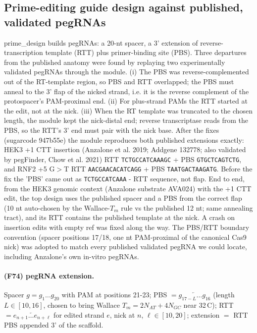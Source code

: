 \subsection{Prime-editing guide design against published, validated pegRNAs}
prime\_design builds pegRNAs: a 20-nt spacer, a 3' extension of reverse-transcription template (RTT) plus primer-binding site (PBS). Three departures from the published anatomy were found by replaying two experimentally validated pegRNAs through the module. (i) The PBS was reverse-complemented out of the RT-template region, so PBS and RTT overlapped; the PBS must anneal to the 3' flap of the nicked strand, i.e. it is the reverse complement of the protospacer's PAM-proximal end. (ii) For plus-strand PAMs the RTT started at the edit, not at the nick. (iii) When the RT template was truncated to the chosen length, the module kept the nick-distal end; reverse transcriptase reads from the PBS, so the RTT's 3' end must pair with the nick base. After the fixes (sugarcode 947b55e) the module reproduces both published extensions exactly: HEK3 +1 CTT insertion (Anzalone et al. 2019; Addgene 132778; also validated by pegFinder, Chow et al. 2021) RTT \texttt{TCTGCCATCAAAGC} + PBS \texttt{GTGCTCAGTCTG}, and RNF2 +5 G$>$T RTT \texttt{AACGAACACATCAGG} + PBS \texttt{TAATGACTAAGATG}. Before the fix the 'PBS' came out as \texttt{TCTGCCATCAAA} - RTT sequence, not flap. End to end, from the HEK3 genomic context (Anzalone substrate AVA024) with the +1 CTT edit, the top design uses the published spacer and a PBS from the correct flap (10 nt auto-chosen by the Wallace-$T_m$ rule vs the published 12 nt; same annealing tract), and its RTT contains the published template at the nick. A crash on insertion edits with empty ref was fixed along the way. The PBS/RTT boundary convention (spacer positions 17/18, one nt PAM-proximal of the canonical Cas9 nick) was adopted to match every published validated pegRNA we could locate, including Anzalone's own in-vitro pegRNAs.
\paragraph{(F74) pegRNA extension.} Spacer $g=g_1\dots g_{20}$ with PAM at positions 21-23; PBS $=\overleftarrow{g_{17-L}\dots g_{16}}$ (length $L\in[10,16]$, chosen to bring Wallace $T_m=2N_{AT}+4N_{GC}$ near 32\,\textdegree C); RTT $=\overleftarrow{e_{n+1}\dots e_{n+\ell}}$ for edited strand $e$, nick at $n$, $\ell\in[10,20]$; extension $=$ RTT\,\textbullet\,PBS appended 3' of the scaffold.
